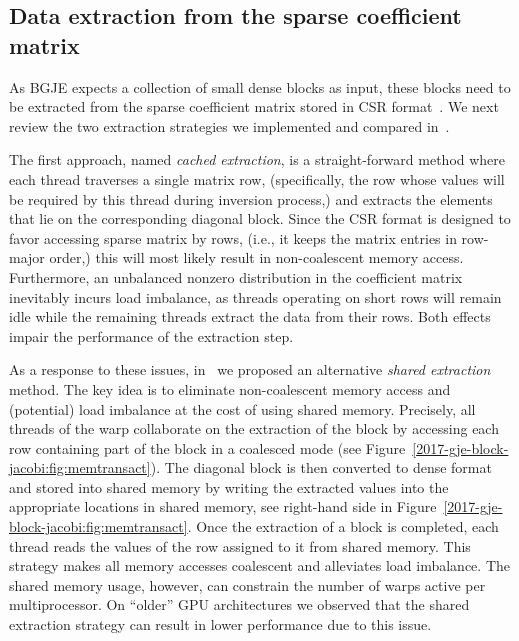 \subsection{Data extraction from the sparse coefficient matrix}
\label{2017-gje-block-jacobi:subsec:s3-extraction}

As BGJE expects a collection of small dense blocks as input,
these blocks need to be extracted from the sparse coefficient matrix
stored in CSR format~\cite{saad}.
We next review the two extraction strategies we implemented and compared 
in~\cite{Anzt:2017:BGE:3026937.3026940}.


The first approach, named {\it cached extraction}, is a straight-forward method
where each thread traverses a single matrix row,
(specifically, the row whose values will be required by this thread during inversion process,)
and extracts the elements that lie on the corresponding diagonal block.
Since the CSR format is designed to favor accessing sparse matrix by rows, 
({i.e., it keeps the matrix entries in row-major order,})
this will most likely result in non-coalescent memory 
access.
Furthermore, an unbalanced nonzero distribution in the coefficient matrix
inevitably incurs load imbalance, as threads operating on short rows will remain idle while the 
remaining threads extract the data from their rows.
Both effects impair the performance of the extraction step.


As a response to these issues, in~\cite{Anzt:2017:BGE:3026937.3026940} we proposed 
an alternative 
{\it shared extraction} method.
The key idea is to eliminate non-coalescent memory access and
(potential) load imbalance at the cost of using shared memory.
Precisely, all threads of the warp collaborate on the extraction of the block
by accessing each row containing part of the block in a coalesced mode
(see Figure~\ref{2017-gje-block-jacobi:fig:memtransact}).
The diagonal block is then converted to dense format and stored 
into shared memory by writing the extracted 
values into the appropriate locations in shared memory, see right-hand side  in Figure~\ref{2017-gje-block-jacobi:fig:memtransact}.
Once the extraction of a block is completed,
each thread reads the values of the row assigned to it from shared memory.
This strategy makes all memory accesses coalescent
and alleviates load imbalance.
The shared memory usage, however, can constrain
the number of warps active per multiprocessor.
On ``older'' GPU architectures we observed that the shared extraction
strategy can result in lower performance due to this issue.

